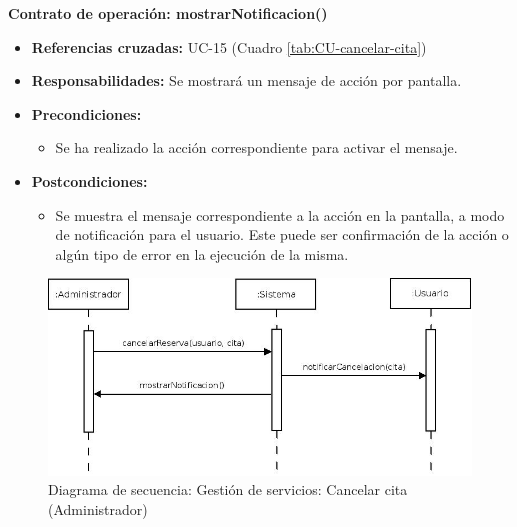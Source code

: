 \textbf{Contrato de operación: mostrarNotificacion()}
\begin{itemize}
\item \textbf{Referencias cruzadas:} UC-15 (Cuadro \ref{tab:CU-cancelar-cita})
\item \textbf{Responsabilidades:} Se mostrará un mensaje de acción por pantalla.
\item \textbf{Precondiciones:} 
 \begin{itemize}
\item Se ha realizado la acción correspondiente para activar el mensaje.
\end {itemize}
\item \textbf{Postcondiciones:} 
 \begin{itemize}
\item Se muestra el mensaje correspondiente a la acción en la pantalla, a modo de notificación para el usuario. Este puede ser confirmación de la acción o algún tipo de error en la ejecución de la misma.
\end {itemize}
\end {itemize}


\vspace{7mm}
\dotfill
\vspace{7mm}

\begin{figure}[h!]
\centering
  \includegraphics[scale=.50]{img/secuencias/gestion-servicios-cancelar-cita-por-parte-de-admin.jpeg}
  \caption{Diagrama de secuencia: Gestión de servicios: Cancelar cita (Administrador)}
  \label{fig:secuencia-gestion-servicios-cancelar-cita-por-parte-de-admin}
\end{figure}

